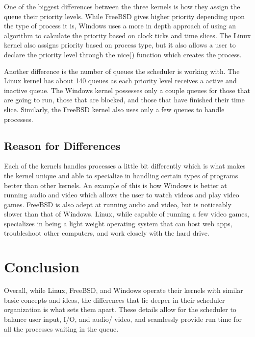 \documentclass[10pt, draftclsnofoot,onecolumn]{IEEEtran}
\begin{document}
One of the biggest differences between the three kernels is how they assign the queue their priority levels. While FreeBSD gives higher priority depending upon the type of process it is, Windows uses a more in depth approach of using an algorithm to calculate the priority based on clock ticks and time slices. The Linux kernel also assigns priority based on process type, but it also allows a user to declare the priority level through the nice() function which creates the process.\par
Another difference is the number of queues the scheduler is working with. The Linux kernel has about 140 queues as each priority level receives a active and inactive queue. The Windows kernel possesses only a couple queues for those that are going to run, those that are blocked, and those that have finished their time slice. Similarly, the FreeBSD kernel also uses only a few queues to handle processes.

\subsection{Reason for Differences}

Each of the kernels handles processes a little bit differently which is what makes the kernel unique and able to specialize in handling certain types of programs better than other kernels. An example of this is how Windows is better at running audio and video which allows the user to watch videos and play video games. FreeBSD is also adept at running audio and video, but is noticeably slower than that of Windows. Linux, while capable of running a few video games, specializes in being a light weight operating system that can host web apps, troubleshoot other computers, and work closely with the hard drive. 

\section{Conclusion}

Overall, while Linux, FreeBSD, and Windows operate their kernels with similar basic concepts and ideas, the differences that lie deeper in their scheduler organization is what sets them apart. These details allow for the scheduler to balance user input, I/O, and audio/ video, and seamlessly provide run time for all the processes waiting in the queue.
\newpage


\end{document}
